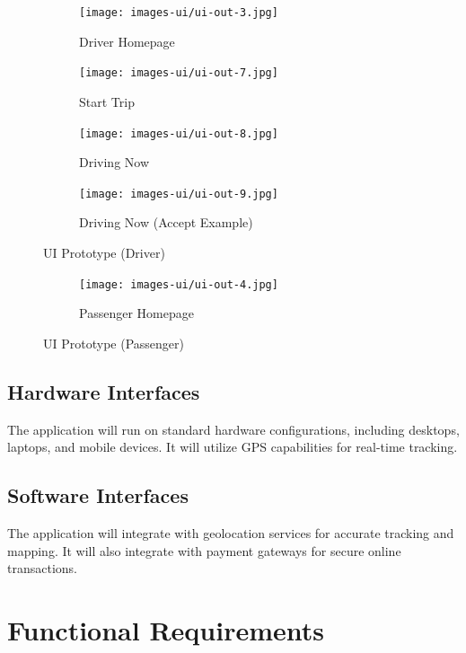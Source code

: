 \documentclass{BusMateSRS}
\begin{document}
\begin{figure}[ht!]
	\centering
	\begin{subfigure}[b]{0.3\textwidth}
		\centering
		\texttt{[image: images-ui/ui-out-3.jpg]}
		\caption{Driver Homepage}
		\label{fig:ui3}
	\end{subfigure}
	\hfill
	\begin{subfigure}[b]{0.3\textwidth}
		\centering
		\texttt{[image: images-ui/ui-out-7.jpg]}
		\caption{Start Trip}
		\label{fig:ui7}
	\end{subfigure}
	\hfill
	\begin{subfigure}[b]{0.3\textwidth}
		\centering
		\texttt{[image: images-ui/ui-out-8.jpg]}
		\caption{Driving Now}
		\label{fig:ui8}
	\end{subfigure}
	\hfill
	\begin{subfigure}[b]{0.3\textwidth}
		\centering
		\texttt{[image: images-ui/ui-out-9.jpg]}
		\caption{Driving Now (Accept Example)}
		\label{fig:ui9}
	\end{subfigure}
	\caption{UI Prototype (Driver)}
	\label{fig:ui-prototype2}
\end{figure}

\begin{figure}[ht!]
	\centering
	\begin{subfigure}[b]{0.3\textwidth}
		\centering
		\texttt{[image: images-ui/ui-out-4.jpg]}
		\caption{Passenger Homepage}
		\label{fig:ui4}
	\end{subfigure}
	\caption{UI Prototype (Passenger)}
	\label{fig:ui-prototype3}
\end{figure}

\subsection{Hardware Interfaces}
The application will run on standard hardware configurations,
including desktops, laptops, and mobile devices.
It will utilize GPS capabilities for real-time tracking.

\subsection{Software Interfaces}
The application will integrate with geolocation services for accurate tracking
and mapping. It will also integrate with payment gateways for secure online
transactions.

\section{Functional Requirements}
\end{document}
